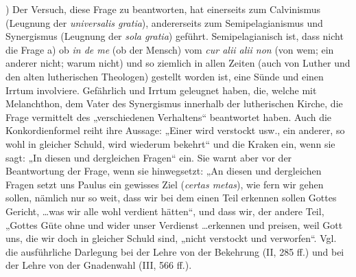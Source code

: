 ) Der Versuch, diese Frage zu beantworten, hat einerseits zum Calvinismus (Leugnung der \textit{universalis gratia}), andererseits zum Semipelagianismus und Synergismus (Leugnung der \textit{sola gratia}) geführt. Semipelagianisch ist, dass nicht die Frage a) ob \textit{in de me} (ob der Mensch) vom \textit{cur alii alii non} (von wem; ein anderer nicht; warum nicht) und so ziemlich in allen Zeiten (auch von Luther und den alten lutherischen Theologen) gestellt worden ist, eine Sünde und einen Irrtum involviere. Gefährlich und Irrtum geleugnet haben, die, welche mit Melanchthon, dem Vater des Synergismus innerhalb der lutherischen Kirche, die Frage vermittelt des „verschiedenen Verhaltens“ beantwortet haben. Auch die Konkordienformel reiht ihre Aussage: „Einer wird verstockt usw., ein anderer, so wohl in gleicher Schuld, wird wiederum bekehrt“ und die Kraken ein, wenn sie sagt: „In diesen und dergleichen Fragen“ ein. Sie warnt aber vor der Beantwortung der Frage, wenn sie hinwegsetzt: „An diesen und dergleichen Fragen setzt uns Paulus ein gewisses Ziel (\textit{certas metas}), wie fern wir gehen sollen, nämlich nur so weit, dass wir bei dem einen Teil erkennen sollen Gottes Gericht, \ldots was wir alle wohl verdient hätten“, und dass wir, der andere Teil, „Gottes Güte ohne und wider unser Verdienst \ldots erkennen und preisen, weil Gott uns, die wir doch in gleicher Schuld sind, „nicht verstockt und verworfen“. Vgl. die ausführliche Darlegung bei der Lehre von der Bekehrung (II, 285 ff.) und bei der Lehre von der Gnadenwahl (III, 566 ff.).